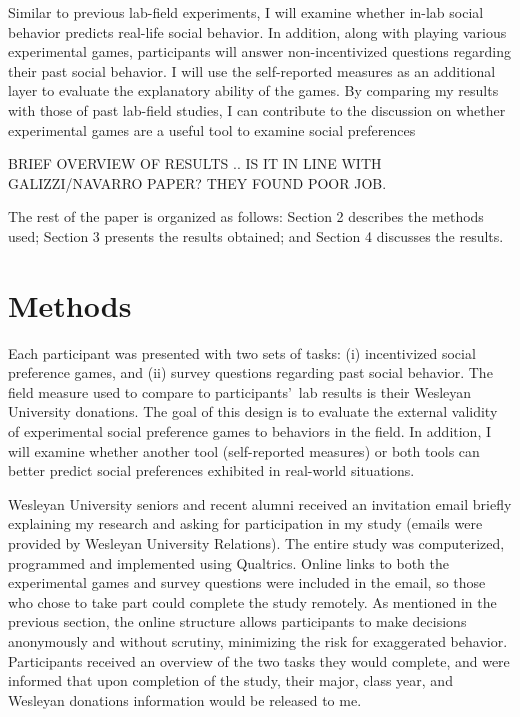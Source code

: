 \documentclass[12pt]{article}
\begin{document}
Similar to previous lab-field experiments, I will examine whether in-lab social behavior predicts real-life social behavior. In addition, along with playing various experimental games, participants will answer non-incentivized questions regarding their past social behavior. I will use the self-reported measures as an additional layer to evaluate the explanatory ability of the games. By comparing my results with those of past lab-field studies, I can contribute to the discussion on whether experimental games are a useful tool to examine social preferences

{\color{red} BRIEF OVERVIEW OF RESULTS .. IS IT IN LINE WITH GALIZZI/NAVARRO PAPER? THEY FOUND POOR JOB. }

The rest of the paper is organized as follows: Section 2 describes the methods used; Section 3 presents the results obtained; and Section 4 discusses the results.


\section{Methods}

Each participant was presented with two sets of tasks: (i) incentivized social preference games, and (ii) survey questions regarding past social behavior. The field measure used to compare to participants\rq \ lab results is their Wesleyan University donations. The goal of this design is to evaluate the external validity of experimental social preference games to behaviors in the field. In addition, I will examine whether another tool (self-reported measures) or both tools can better predict social preferences exhibited in real-world situations. 
 
Wesleyan University seniors and recent alumni received an invitation email briefly explaining my research and asking for participation in my study (emails were provided by Wesleyan University Relations). The entire study was computerized, programmed and implemented using Qualtrics. Online links to both the experimental games and survey questions were included in the email, so those who chose to take part could complete the study remotely. As mentioned in the previous section, the online structure allows participants to make decisions anonymously and without scrutiny, minimizing the risk for exaggerated behavior. Participants received an overview of the two tasks they would complete, and were informed that upon completion of the study, their major, class year, and Wesleyan donations information would be released to me.
\end{document}

